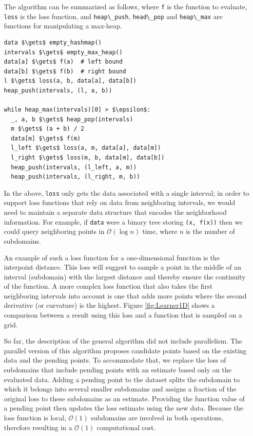 The algorithm can be summarized as follows, where \passthrough{\lstinline!f!} is the function to evaluate, \passthrough{\lstinline!loss!} is the loss function, and \passthrough{\lstinline!heap\_push!}, \passthrough{\lstinline!head\_pop!} and \passthrough{\lstinline!heap\_max!} are functions for manipulating a max-heap.

\begin{lstlisting}
data $\gets$ empty_hashmap()
intervals $\gets$ empty_max_heap()
data[a] $\gets$ f(a)  # left bound
data[b] $\gets$ f(b)  # right bound
l $\gets$ loss(a, b, data[a], data[b])
heap_push(intervals, (l, a, b))

while heap_max(intervals)[0] > $\epsilon$:
  _, a, b $\gets$ heap_pop(intervals)
  m $\gets$ (a + b) / 2
  data[m] $\gets$ f(m)
  l_left $\gets$ loss(a, m, data[a], data[m])
  l_right $\gets$ loss(m, b, data[m], data[b])
  heap_push(intervals, (l_left, a, m))
  heap_push(intervals, (l_right, m, b))
\end{lstlisting}

In the above, \passthrough{\lstinline!loss!} only gets the data associated with a single interval;
in order to support loss functions that rely on data from neighboring intervals, we would need to maintain a separate data structure that encodes the neighborhood information.
For example, if \passthrough{\lstinline!data!} were a binary tree storing \passthrough{\lstinline!(x, f(x))!} then we could query neighboring points in $\mathcal{O}(\log n)$ time, where $n$ is the number of subdomains.


An example of such a loss function for a one-dimensional function is the interpoint distance.
This loss will suggest to sample a point in the middle of an interval (subdomain) with the largest distance and thereby ensure the continuity of the function.
A more complex loss function that also takes the first neighboring intervals into account is one that adds more points where the second derivative (or curvature) is the highest.
Figure \ref{fig:Learner1D} shows a comparison between a result using this loss and a function that is sampled on a grid.


So far, the description of the general algorithm did not include parallelism.
The parallel version of this algorithm proposes candidate points based on the existing data and the pending points.
To accommodate that, we replace the loss of subdomains that include pending points with an estimate based only on the evaluated data.
Adding a pending point to the dataset splits the subdomain to which it belongs into several smaller subdomains and assigns a fraction of the original loss to these subdomains as an estimate.
Providing the function value of a pending point then updates the loss estimate using the new data.
Because the loss function is local, $\mathcal{O}(1)$ subdomains are involved in both operations, therefore resulting in a $\mathcal{O}(1)$ computational cost.

